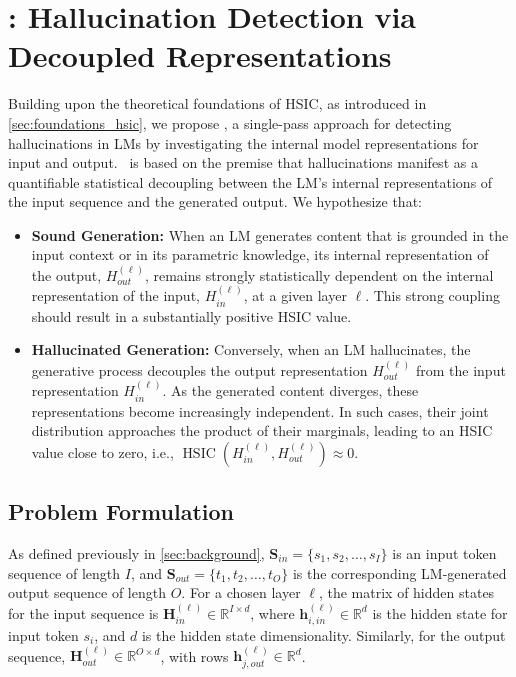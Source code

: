 \section{\method: Hallucination Detection via Decoupled Representations}
\label{sec:irid}

Building upon the theoretical foundations of HSIC, as introduced in \cref{sec:foundations_hsic}, we propose \method, a single-pass approach for detecting hallucinations in LMs by investigating the internal model representations for input and output. \method~is based on the premise that hallucinations manifest as a quantifiable statistical decoupling between the LM's internal representations of the input sequence and the generated output.
We hypothesize that:
\begin{itemize}
    \item[\textbf{(i)}] \textbf{Sound Generation:} When an LM generates content that is grounded in the input context or in its parametric knowledge, its internal representation of the output, $H_{out}^{(\ell)}$, remains strongly statistically dependent on the internal representation of the input, $H_{in}^{(\ell)}$, at a given layer $\ell$. This strong coupling should result in a substantially positive HSIC value.
    
    \item[\textbf{(ii)}] \textbf{Hallucinated Generation:} Conversely, when an LM hallucinates, the generative process decouples the output representation $H_{out}^{(\ell)}$ from the input representation $H_{in}^{(\ell)}$. As the generated content diverges, these representations become increasingly independent. In such cases, their joint distribution approaches the product of their marginals, leading to an HSIC value close to zero, i.e., $\operatorname{HSIC}(H_{in}^{(\ell)}, H_{out}^{(\ell)}) \approx 0$.
\end{itemize}


\subsection{Problem Formulation}
\label{subsec:irid_problem_formulation}
As defined previously in \cref{sec:background}, $\mathbf{S}_{in} = \{s_1, s_2, \ldots, s_I\}$ is an input token sequence of length $I$, and $\mathbf{S}_{out} = \{t_1, t_2, \ldots, t_O\}$ is the corresponding LM-generated output sequence of length $O$. For a chosen layer $\ell$, the matrix of hidden states for the input sequence is $\mathbf{H}_{in}^{(\ell)} \in \mathbb{R}^{I \times d}$, where $\mathbf{h}_{i,in}^{(\ell)} \in \mathbb{R}^d$ is the hidden state for input token $s_i$, and $d$ is the hidden state dimensionality. Similarly, for the output sequence, $\mathbf{H}_{out}^{(\ell)} \in \mathbb{R}^{O \times d}$, with rows $\mathbf{h}_{j,out}^{(\ell)} \in \mathbb{R}^d$.


